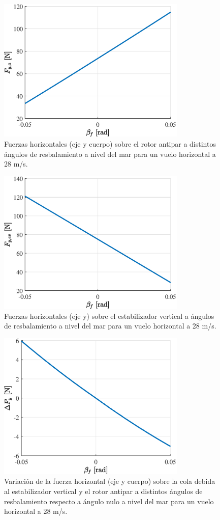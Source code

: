 \begin{figure}
	\centering
	\includegraphics[width=90mm]{graficos/FAPb}
	\caption{Fuerzas horizontales (eje y cuerpo) sobre el rotor antipar a distintos ángulos de resbalamiento a nivel del mar para un vuelo horizontal a 28 m/s.}
	\label{FAPb}
\end{figure}

\begin{figure}
	\centering
	\includegraphics[width=90mm]{graficos/FEVb}
	\caption{Fuerzas horizontales (eje y) sobre el estabilizador vertical a ángulos de resbalamiento a nivel del mar para un vuelo horizontal a 28 m/s.}
	\label{FEVb}
\end{figure}

\begin{figure}
	\centering
	\includegraphics[width=90mm]{graficos/deltafyb}
	\caption{Variación de la fuerza horizontal (eje y cuerpo) sobre la cola debida al estabilizador vertical y el rotor antipar a distintos ángulos de resbalamiento respecto a ángulo nulo a nivel del mar para un vuelo horizontal a 28 m/s.}
	\label{deltafyb}
\end{figure}

